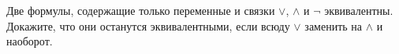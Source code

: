 Две формулы, содержащие только переменные и связки $\lor$, $\land$ и $\lnot$ эквивалентны. Докажите, что
они останутся эквивалентными, если всюду $\lor$ заменить на $\land$ и наоборот.
